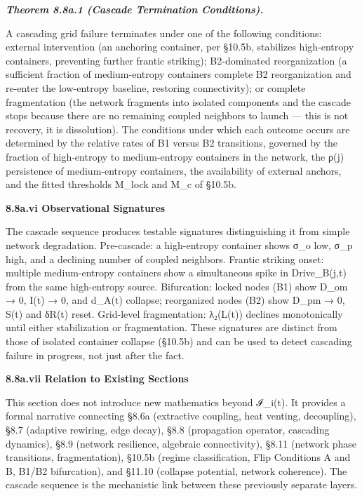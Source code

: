 \documentclass[
]{article}
\begin{document}
\emph{\textbf{Theorem 8.8a.1 (Cascade Termination Conditions).}}

A cascading grid failure terminates under one of the following
conditions: external intervention (an anchoring container, per §10.5b,
stabilizes high-entropy containers, preventing further frantic
striking); B2-dominated reorganization (a sufficient fraction of
medium-entropy containers complete B2 reorganization and re-enter the
low-entropy baseline, restoring connectivity); or complete fragmentation
(the network fragments into isolated components and the cascade stops
because there are no remaining coupled neighbors to launch --- this is
not recovery, it is dissolution). The conditions under which each
outcome occurs are determined by the relative rates of B1 versus B2
transitions, governed by the fraction of high-entropy to medium-entropy
containers in the network, the ρ(j) persistence of medium-entropy
containers, the availability of external anchors, and the fitted
thresholds M\_lock and M\_c of §10.5b.

\textbf{8.8a.vi Observational Signatures}

The cascade sequence produces testable signatures distinguishing it from
simple network degradation. Pre-cascade: a high-entropy container shows
σ\_o low, σ\_p high, and a declining number of coupled neighbors.
Frantic striking onset: multiple medium-entropy containers show a
simultaneous spike in Drive\_B(j,t) from the same high-entropy source.
Bifurcation: locked nodes (B1) show D\_om → 0, I(t) → 0, and d\_A(t)
collapse; reorganized nodes (B2) show D\_pm → 0, S(t) and δR(t) reset.
Grid-level fragmentation: λ₂(L(t)) declines monotonically until either
stabilization or fragmentation. These signatures are distinct from those
of isolated container collapse (§10.5b) and can be used to detect
cascading failure in progress, not just after the fact.

\textbf{8.8a.vii Relation to Existing Sections}

This section does not introduce new mathematics beyond ℐ\_i(t). It
provides a formal narrative connecting §8.6a (extractive coupling, heat
venting, decoupling), §8.7 (adaptive rewiring, edge decay), §8.8
(propagation operator, cascading dynamics), §8.9 (network resilience,
algebraic connectivity), §8.11 (network phase transitions,
fragmentation), §10.5b (regime classification, Flip Conditions A and B,
B1/B2 bifurcation), and §11.10 (collapse potential, network coherence).
The cascade sequence is the mechanistic link between these previously
separate layers.
\end{document}
